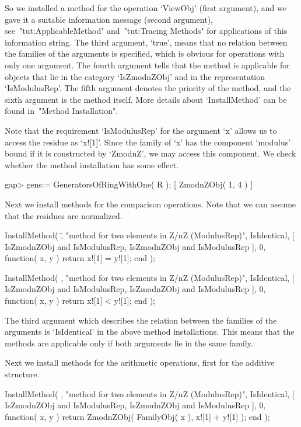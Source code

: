 So we installed a method for the operation `ViewObj' (first argument),
and we gave it a suitable information message (second argument),
see~"tut:ApplicableMethod" and~"tut:Tracing Methods" for applications of
this information string.
The third argument, `true', means that no relation between the families
of the arguments is specified, which is obvious for operations with only
one argument.
The fourth argument tells {\GAP} that the method is applicable for
objects that lie in the category `IsZmodnZObj' and in the representation
`IsModulusRep'.
The fifth argument denotes the priority of the method,
and the sixth argument is the method itself.
More details about `InstallMethod' can be found in~"Method Installation".

Note that the requirement `IsModulusRep' for the argument `x' allows us
to access the residue as `x![1]'.
Since the family of `x' has the component `modulus' bound if it is
constructed by `ZmodnZ', we may access this component.
We check whether the method installation has some effect.

\begintt
    gap> gens:= GeneratorsOfRingWithOne( R );
    [ ZmodnZObj( 1, 4 ) ]
\endtt

Next we install methods for the comparison operations.
Note that we can assume that the residues are normalized.

\begintt
    InstallMethod( \=,
        "method for two elements in Z/nZ (ModulusRep)",
        IsIdentical,
        [ IsZmodnZObj and IsModulusRep, IsZmodnZObj and IsModulusRep ],
        0,
        function( x, y ) return x![1] = y![1]; end );

    InstallMethod( \<,
        "method for two elements in Z/nZ (ModulusRep)",
        IsIdentical,
        [ IsZmodnZObj and IsModulusRep, IsZmodnZObj and IsModulusRep ],
        0,
        function( x, y ) return x![1] < y![1]; end );
\endtt

The third argument which describes the relation between the families of
the arguments is `IsIdentical' in the above method installations.
This means that the methods are applicable only if both arguments lie in
the same family.

Next we install methods for the arithmetic operations,
first for the additive structure.

\begintt
    InstallMethod( \+,
        "method for two elements in Z/nZ (ModulusRep)",
        IsIdentical,
        [ IsZmodnZObj and IsModulusRep, IsZmodnZObj and IsModulusRep ],
        0,
        function( x, y )
        return ZmodnZObj( FamilyObj( x ), x![1] + y![1] );
        end );

